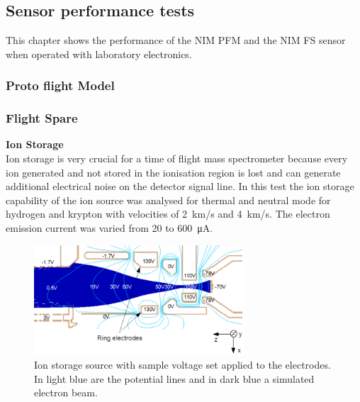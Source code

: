 	\subsection{Sensor performance tests}
		This chapter shows the performance of the NIM PFM and the NIM FS sensor when operated with laboratory electronics.
		
		\subsubsection{Proto flight Model}\label{sec:paper}
		
		\newpage
		\subsubsection{Flight Spare}\label{chap:FSCalib}
		\textbf{Ion Storage}\\
		Ion storage is very crucial for a time of flight mass spectrometer because every ion generated and not stored in the ionisation region is lost and can generate additional electrical noise on the detector signal line. In this test the ion storage capability of the ion source was analysed for thermal and neutral mode for hydrogen and krypton with velocities of 2~km/s and 4~km/s. The electron emission current was varied from 20 to 600~\si{\micro\ampere}.
		\begin{figure}[H]
			\centering
			\includegraphics[width = 0.7\textwidth]{Experiments/FiL_IS_elBeam_Storage.png}
			\caption{Ion storage source with sample voltage set applied to the electrodes. In light blue are the potential lines and in dark blue a simulated electron beam.}
			\label{fig:ExpFSFlightSenIonStorIS}
		\end{figure}
